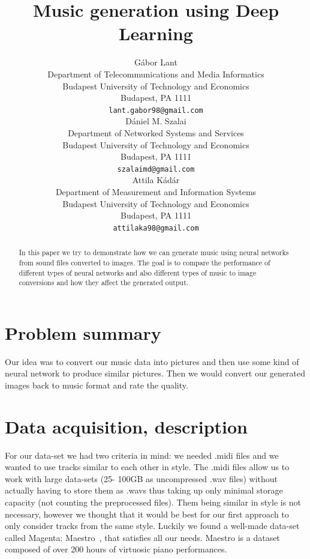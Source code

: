 \documentclass{article}
\title{Music generation using Deep Learning}
\author{
	Gábor Lant \\
	Department of Telecommunications and Media Informatics\\
	Budapest University of Technology and Economics\\
	Budapest, PA 1111 \\
	\texttt{lant.gabor98@gmail.com} \\
	\And
	Dániel M. Szalai\\
	Department of Networked Systems and Services\\
	Budapest University of Technology and Economics\\
	Budapest, PA 1111\\
	\texttt{szalaimd@gmail.com}\\
	\And
	Attila Kádár\\
	Department of Measurement and Information Systems\\
	Budapest University of Technology and Economics\\
	Budapest, PA 1111\\
	\texttt{attilaka98@gmail.com}
}
\begin{document}

\maketitle



\begin{abstract}
  In this paper we try to demonstrate how we can generate music using neural networks from sound files converted to images. The goal is to compare the performance of different types of neural networks and also different types of music to image conversions and how they affect the generated output.
\end{abstract}


\section{Problem summary}
\label{sec:summary}
Our idea was to convert our music data into pictures and then use some kind of neural network to produce similar pictures. Then we would convert our generated images back to music format and rate the quality.

\section{Data acquisition, description}
\label{sec:data}
For our data-set we had two criteria in mind: we needed .midi files and we wanted to use tracks similar to each other in style. The .midi files allow us to work with large data-sets (25- 100GB as uncompressed .wav files) without actually having to store them as .wavs thus taking up only minimal storage capacity (not counting the preprocessed files). Them being similar in style is not necessary, however we thought that it would be best for our first approach to only consider tracks from the same style. Luckily we found a well-made data-set called Magenta: Maestro~\cite{maestro}, that satisfies all our needs. Maestro is a dataset composed of over 200 hours of virtuosic piano performances.
\end{document}
